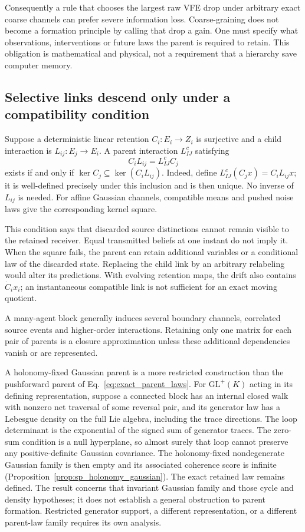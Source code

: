 Consequently a rule that chooses the largest raw VFE drop under arbitrary exact coarse channels can prefer severe information loss. Coarse-graining does not become a formation principle by calling that drop a gain. One must specify what observations, interventions or future laws the parent is required to retain. This obligation is mathematical and physical, not a requirement that a hierarchy save computer memory.

\subsection{Selective links descend only under a compatibility condition}
Suppose a deterministic linear retention $C_i:E_i\to Z_i$ is surjective and a child interaction is $L_{ij}:E_j\to E_i$. A parent interaction $L^c_{IJ}$ satisfying
\begin{equation}
C_iL_{ij}=L^c_{IJ}C_j
\label{eq:parent_link_square}
\end{equation}
exists if and only if $\ker C_j\subseteq\ker(C_iL_{ij})$.
Indeed, define $L^c_{IJ}(C_jx)=C_iL_{ij}x$; it is well-defined precisely under this inclusion and is then unique. No inverse of $L_{ij}$ is needed. For affine Gaussian channels, compatible means and pushed noise laws give the corresponding kernel square.

This condition says that discarded source distinctions cannot remain visible to the retained receiver. Equal transmitted beliefs at one instant do not imply it. When the square fails, the parent can retain additional variables or a conditional law of the discarded state. Replacing the child link by an arbitrary relabeling would alter its predictions. With evolving retention maps, the drift also contains $\dot C_i x_i$; an instantaneous compatible link is not sufficient for an exact moving quotient.

A many-agent block generally induces several boundary channels, correlated source events and higher-order interactions. Retaining only one matrix for each pair of parents is a closure approximation unless these additional dependencies vanish or are represented.

A holonomy-fixed Gaussian parent is a more restricted construction than the pushforward parent of Eq.~\eqref{eq:exact_parent_laws}. For $\mathrm{GL}^+(K)$ acting in its defining representation, suppose a connected block has an internal closed walk with nonzero net traversal of some reversal pair, and its generator law has a Lebesgue density on the full Lie algebra, including the trace directions. The loop determinant is the exponential of the signed sum of generator traces. The zero-sum condition is a null hyperplane, so almost surely that loop cannot preserve any positive-definite Gaussian covariance. The holonomy-fixed nondegenerate Gaussian family is then empty and its associated coherence score is infinite (Proposition~\ref{prop:sp_holonomy_gaussian}). The exact retained law remains defined. The result concerns that invariant Gaussian family and those cycle and density hypotheses; it does not establish a general obstruction to parent formation. Restricted generator support, a different representation, or a different parent-law family requires its own analysis.

